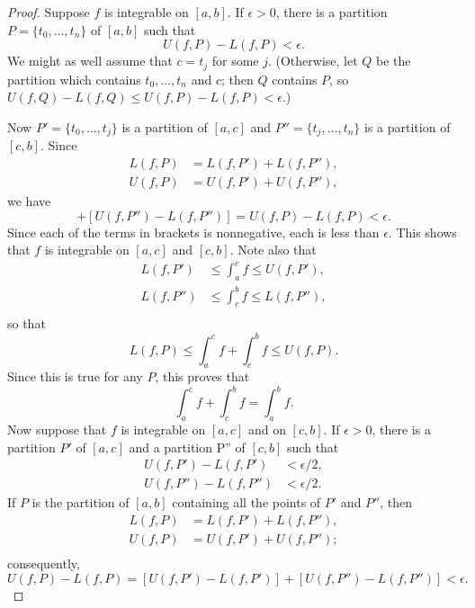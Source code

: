 \documentclass{article}
\begin{document}
\begin{proof}
  Suppose $f$ is integrable on $[a, b]$. If $\epsilon > 0$, there is a
  partition $P = \{t_0, \ldots, t_n\}$ of $[a, b]$ such that \begin{equation*}
    U(f, P) - L(f, P) < \epsilon.
  \end{equation*} We might as well assume that $c = t_j$ for some $j$.
  (Otherwise, let $Q$ be the partition which contains $t_0, \ldots, t_n$ and
  $c$; then $Q$ contains $P$, so $U(f, Q) - L(f, Q) \leq U(f, P) - L(f, P) <
  \epsilon$.)

  Now $P' = \{t_0, \ldots, t_j\}$ is a partition of $[a, c]$ and $P'' = \{t_j,
  \ldots, t_n\}$ is a partition of $[c, b]$. Since \begin{align*}
    L(f, P) &= L(f, P') + L(f, P''), \\
    U(f, P) &= U(f, P') + U(f, P''),
  \end{align*} we have \begin{equation*}
    [U(f, P') - L(f, P')] + [U(f, P'') - L(f, P'')] = U(f, P) - L(f, P) <
      \epsilon.
  \end{equation*} Since each of the terms in brackets is nonnegative, each is
  less than $\epsilon$. This shows that $f$ is integrable on $[a, c]$ and $[c,
  b]$. Note also that \begin{align*}
    L(f, P') &\leq \int_a^c f \leq U(f, P'), \\
    L(f, P'') &\leq \int_c^b f \leq L(f, P''), \\
  \end{align*} so that \begin{equation*}
    L(f, P) \leq \int_a^c f + \int_c^b f \leq U(f, P).
  \end{equation*} Since this is true for any $P$, this proves that
  \begin{equation*}
    \int_a^c f + \int_c^b f = \int_a^b f.
  \end{equation*} Now suppose that $f$ is integrable on $[a, c]$ and on $[c,
  b]$. If $\epsilon > 0$, there is a partition $P'$ of $[a, c]$ and a partition
  P'' of $[c, b]$ such that \begin{align*}
    U(f, P') - L(f, P') &< \epsilon/2, \\
    U(f, P'') - L(f, P'') &< \epsilon/2.
  \end{align*} If $P$ is the partition of $[a, b]$ containing all the points of
  $P'$ and $P''$, then \begin{align*}
    L(f, P) &= L(f, P') + L(f, P''), \\
    U(f, P) &= U(f, P') + U(f, P''); \\
  \end{align*} consequently, \begin{equation*}
    U(f, P) - L(f, P) = [U(f, P') - L(f, P')] + [U(f, P'') - L(f, P'')] <
      \epsilon.
  \end{equation*}
\end{proof}
\end{document}
